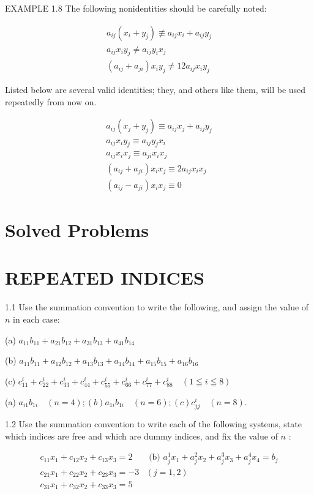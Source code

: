 \documentclass[10pt]{article}
\begin{document}
EXAMPLE 1.8 The following nonidentities should be carefully noted:

$$
\begin{gathered}
a_{i j}\left(x_{i}+y_{j}\right) \not \equiv a_{i j} x_{i}+a_{i j} y_{j} \\
a_{i j} x_{i} y_{j} \neq a_{i j} y_{i} x_{j} \\
\left(a_{i j}+a_{j i}\right) x_{i} y_{j} \neq 12 a_{i j} x_{i} y_{j}
\end{gathered}
$$

Listed below are several valid identities; they, and others like them, will be used repeatedly from now on.


\begin{gather*}
a_{i j}\left(x_{j}+y_{j}\right) \equiv a_{i j} x_{j}+a_{i j} y_{j}  \tag{1:2}\\
a_{i j} x_{i} y_{j} \equiv a_{i j} y_{j} x_{i}  \tag{1.3}\\
a_{i j} x_{i} x_{j} \equiv a_{j i} x_{i} x_{j}  \tag{1.4}\\
\left(a_{i j}+a_{j i}\right) x_{i} x_{j} \equiv 2 a_{i j} x_{i} x_{j}  \tag{1.5}\\
\left(a_{i j}-a_{j i}\right) x_{i} x_{j} \equiv 0 \tag{1.6}
\end{gather*}


\section*{Solved Problems}
\section*{REPEATED INDICES}
1.1 Use the summation convention to write the following, and assign the value of $n$ in each case:

(a) $a_{11} b_{11}+a_{21} b_{12}+a_{31} b_{13}+a_{41} b_{14}$

(b) $a_{11} b_{11}+a_{12} b_{12}+a_{13} b_{13}+a_{14} b_{14}+a_{15} b_{15}+a_{16} b_{16}$

(c) $c_{11}^{i}+c_{22}^{i}+c_{33}^{i}+c_{44}^{i}+c_{55}^{i}+c_{66}^{i}+c_{77}^{i}+c_{88}^{i} \quad(1 \leqq i \leqq 8)$

(a) $a_{i 1} b_{1 i} \quad(n=4) ;(b) a_{1 i} b_{1 i} \quad(n=6) ;(c) c_{j j}^{i} \quad(n=8)$.

1.2 Use the summation convention to write each of the following systems, state which indices are free and which are dummy indices, and fix the value of $n$ :

$$
\begin{array}{lc}
c_{11} x_{1}+c_{12} x_{2}+c_{13} x_{3}=2 & \text { (b) } a_{j}^{1} x_{1}+a_{j}^{2} x_{2}+a_{j}^{3} x_{3}+a_{j}^{4} x_{4}=b_{j} \\
c_{21} x_{1}+c_{22} x_{2}+c_{23} x_{3}=-3 & (j=1,2) \\
c_{31} x_{1}+c_{32} x_{2}+c_{33} x_{3}=5 &
\end{array}
$$
\end{document}
